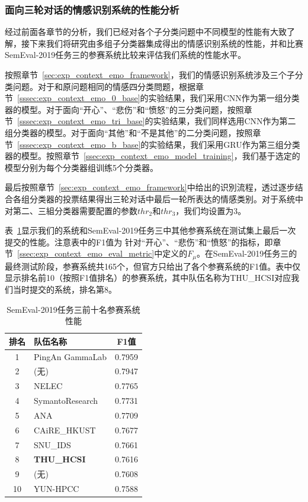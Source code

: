 \subsubsection{面向三轮对话的情感识别系统的性能分析}

经过前面各章节的分析，我们已经对各个子分类问题中不同模型的性能有大致了解，接下来我们将研究由多组子分类器集成得出的情感识别系统的性能，并和比赛SemEval-2019任务三的参赛系统比较来评估我们系统的性能水平。

按照章节~\ref{sec:exp_context_emo_framework}，我们的情感识别系统涉及三个子分类问题。对于和原问题相同的情感四分类問题，根据章节~\ref{sssec:exp_context_emo_0_base}的实验结果，我们采用CNN作为第一组分类器的模型。对于面向“开心”、“悲伤”和“愤怒”的三分类问题，按照章节~\ref{sssec:exp_context_emo_tri_base}的实验结果，我们同样选用CNN作为第二组分类器的模型。对于面向“其他”和“不是其他”的二分类问题，按照章节~\ref{sssec:exp_context_emo_b_base}的实验结果，我们采用GRU作为第三组分类器的模型。按照章节~\ref{ssec:exp_context_emo_model_training}，我们基于选定的模型分别为每个分类器组训练5个分类器。

最后按照章节~\ref{sec:exp_context_emo_framework}中给出的识別流程，透过逐步结合各组分类器的投票结果得出三轮对话中最后一轮所表达的情感类别。对于系统中对第二、三組分类器需要配置的参数$thr_2$和$thr_3$，我们均设置为3。

表~\ref{tab:exp_context_emo_other_comp}显示我们的系统和SemEval-2019任务三中其他参赛系统在测试集上最后一次提交的性能。注意表中的F1值为
针对“开心”、“悲伤”和“愤怒”的指标，即章节~\ref{ssec:exp_context_emo_eval_metric}中定义的$F_\mu$。在SemEval-2019任务三的最终测试阶段，参赛系统共165个，但官方只给出了各个参赛系统的F1值。表中仅显示排名前10（按照F1值排名）的参赛系统，其中队伍名称为THU\_HCSI对应我们当时提交的系统，排名第8。

\begin{table}[htb]
  \centering
  \begin{minipage}[t]{0.6\linewidth}
  \caption{SemEval-2019任务三前十名参赛系统性能} %
  \label{tab:exp_context_emo_other_comp}
    \begin{tabularx}{\linewidth}{c|X|c}
    \toprule[1.5pt]
    排名 & 队伍名称 & F1值 \\
    \hline
    1 & PingAn GammaLab & 0.7959 \\
    2 & (无) & 0.7947 \\
    3 & NELEC & 0.7765 \\
    4 & SymantoResearch & 0.7731 \\
    5 & ANA & 0.7709 \\
    6 & CAiRE\_HKUST & 0.7677 \\
    7 & SNU\_IDS & 0.7661 \\
    8 & \bf THU\_HCSI & 0.7616 \\
    9 & (无) & 0.7608 \\
    10 & YUN-HPCC & 0.7588 \\
    \bottomrule[1.5pt]
    \end{tabularx}
  \end{minipage}
\end{table}


